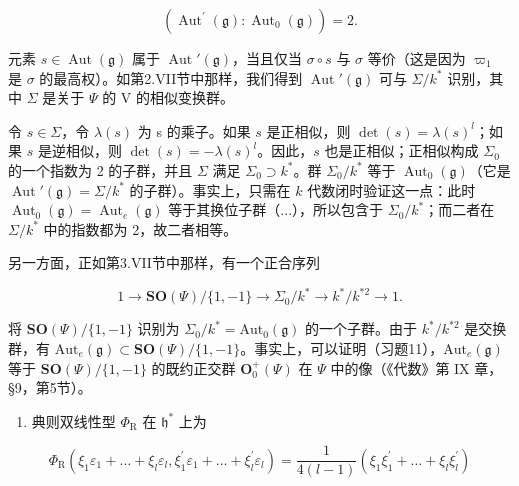 \[
\left(\operatorname{Aut} ^ {\prime} (\mathfrak {g}): \operatorname{Aut} _ {0} (\mathfrak {g})\right) = 2.
\]

元素 \(s \in \operatorname{Aut}(\mathfrak{g})\) 属于 \(\operatorname{Aut}'(\mathfrak{g})\)，当且仅当 \(\sigma \circ s\) 与 \(\sigma\) 等价（这是因为 \(\varpi_{1}\) 是 \(\sigma\) 的最高权）。如第2.VII节中那样，我们得到 \(\operatorname{Aut}'(\mathfrak{g})\) 可与 \(\Sigma/k^{*}\) 识别，其中 \(\Sigma\) 是关于 \(\Psi\) 的 V 的相似变换群。

令 \(s \in \Sigma\)，令 \(\lambda(s)\) 为 s 的乘子。如果 \(s\) 是正相似，则 \(\det(s) = \lambda(s)^l\)；如果 \(s\) 是逆相似，则 \(\det(s) = -\lambda(s)^l\)。因此，\(s\) 也是正相似；正相似构成 \(\Sigma_0\) 的一个指数为 2 的子群，并且 \(\Sigma\) 满足 \(\Sigma_0 \supset k^*\)。群 \(\Sigma_0 / k^*\) 等于 \(\operatorname{Aut}_0(\mathfrak{g})\)（它是 \(\operatorname{Aut}'(\mathfrak{g}) = \Sigma / k^*\) 的子群）。事实上，只需在 \(k\) 代数闭时验证这一点：此时 \(\operatorname{Aut}_0(\mathfrak{g}) = \operatorname{Aut}_e(\mathfrak{g})\) 等于其换位子群（...），所以包含于 \(\Sigma_0 / k^*\)；而二者在 \(\Sigma / k^*\) 中的指数都为 2，故二者相等。

另一方面，正如第3.VII节中那样，有一个正合序列

\[
1 \longrightarrow \mathbf {S O} (\varPsi) / \{1, - 1 \} \longrightarrow \varSigma_ {0} / k ^ {*} \longrightarrow k ^ {*} / k ^ {* 2} \longrightarrow 1.
\]

将 \(\mathbf{SO}(\varPsi)/\{1,-1\}\) 识别为 \(\Sigma_{0}/k^{*}=\mathrm{Aut}_{0}(\mathfrak{g})\) 的一个子群。由于 \(k^{*}/k^{*2}\) 是交换群，有 \(\mathrm{Aut}_{e}(\mathfrak{g})\subset\mathbf{SO}(\varPsi)/\{1,-1\}\)。事实上，可以证明（习题11），\(\mathrm{Aut}_{e}(\mathfrak{g})\) 等于 \(\mathbf{SO}(\varPsi)/\{1,-1\}\) 的既约正交群 \(\mathbf{O}_{0}^{+}(\varPsi)\) 在 \(\varPsi\) 中的像（《代数》第 IX 章，§9，第5节）。

\begin{enumerate}
\def\labelenumi{(\Roman{enumi})}
\setcounter{enumi}{7}
\tightlist
\item
典则双线性型 \(\varPhi_{\mathrm{R}}\) 在 \(\mathfrak{h}^*\) 上为
\end{enumerate}

\[
\Phi_ {\mathrm{R}} \left(\xi_ {1} \varepsilon_ {1} + \dots + \xi_ {l} \varepsilon_ {l}, \xi_ {1} ^ {\prime} \varepsilon_ {1} + \dots + \xi_ {l} ^ {\prime} \varepsilon_ {l}\right) = \frac {1}{4 (l - 1)} \left(\xi_ {1} \xi_ {1} ^ {\prime} + \dots + \xi_ {l} \xi_ {l} ^ {\prime}\right)
\]

